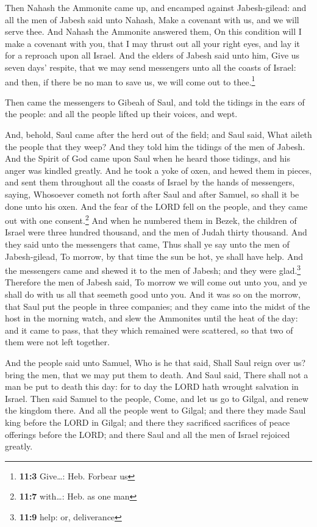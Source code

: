  Then Nahash the Ammonite came up, and encamped against
Jabesh-gilead: and all the men of Jabesh said unto Nahash, Make a
covenant with us, and we will serve thee.  And Nahash the
Ammonite answered them, On this condition will I make a covenant with
you, that I may thrust out all your right eyes, and lay it for a
reproach upon all Israel.  And the elders of Jabesh said
unto him, Give us seven days' respite, that we may send messengers unto
all the coasts of Israel: and then, if there be no man to save us, we
will come out to thee.\footnote{\textbf{11:3} Give\ldots: Heb. Forbear
  us}

 Then came the messengers to Gibeah of Saul, and told the
tidings in the ears of the people: and all the people lifted up their
voices, and wept.

 And, behold, Saul came after the herd out of the field;
and Saul said, What aileth the people that they weep? And they told him
the tidings of the men of Jabesh.  And the Spirit of God
came upon Saul when he heard those tidings, and his anger was kindled
greatly.  And he took a yoke of oxen, and hewed them in
pieces, and sent them throughout all the coasts of Israel by the hands
of messengers, saying, Whosoever cometh not forth after Saul and after
Samuel, so shall it be done unto his oxen. And the fear of the LORD fell
on the people, and they came out with one consent.\footnote{\textbf{11:7}
  with\ldots: Heb. as one man}  And when he numbered them
in Bezek, the children of Israel were three hundred thousand, and the
men of Judah thirty thousand.  And they said unto the
messengers that came, Thus shall ye say unto the men of Jabesh-gilead,
To morrow, by that time the sun be hot, ye shall have help. And the
messengers came and shewed it to the men of Jabesh; and they were
glad.\footnote{\textbf{11:9} help: or, deliverance} 
Therefore the men of Jabesh said, To morrow we will come out unto you,
and ye shall do with us all that seemeth good unto you. 
And it was so on the morrow, that Saul put the people in three
companies; and they came into the midst of the host in the morning
watch, and slew the Ammonites until the heat of the day: and it came to
pass, that they which remained were scattered, so that two of them were
not left together.

 And the people said unto Samuel, Who is he that said,
Shall Saul reign over us? bring the men, that we may put them to death.
 And Saul said, There shall not a man be put to death
this day: for to day the LORD hath wrought salvation in Israel.
 Then said Samuel to the people, Come, and let us go to
Gilgal, and renew the kingdom there.  And all the people
went to Gilgal; and there they made Saul king before the LORD in Gilgal;
and there they sacrificed sacrifices of peace offerings before the LORD;
and there Saul and all the men of Israel rejoiced greatly.

